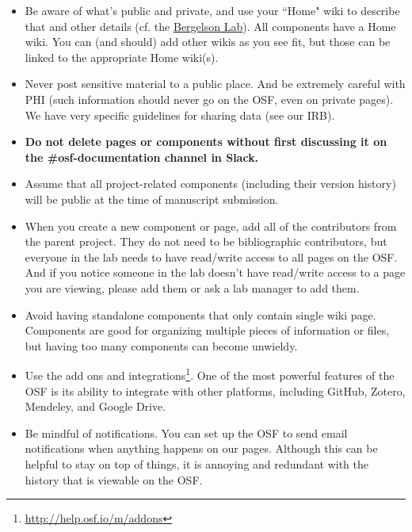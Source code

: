 \documentclass[letterpaper,12pt,oneside]{memoir}
\begin{document}
\begin{itemize}
\item Be aware of what's public and private, and use your ``Home" wiki to describe that and other details (cf. the \href{https://osf.io/3qg96/}{Bergelson Lab}). All components have a Home wiki. You can (and should) add other wikis as you see fit, but those can be linked to the appropriate Home wiki(s).

\item Never post sensitive material to a public place. And be extremely careful with PHI (such information should never go on the OSF, even on private pages). We have very specific guidelines for sharing data (see our IRB). 

\item \textbf{Do not delete pages or components without first discussing it on the \#osf-documentation channel in Slack.}

\item Assume that all project-related components (including their version history) will be public at the time of manuscript submission. 

\item When you create a new component or page, add all of the contributors from the parent project. They do not need to be bibliographic contributors, but everyone in the lab needs to have read/write access to all pages on the OSF. And if you notice someone in the lab doesn't have read/write access to a page you are viewing, please add them or ask a lab manager to add them. 

\item Avoid having standalone components that only contain single wiki page. Components are good for organizing multiple pieces of information or files, but having too many components can become unwieldy. 

\item Use the add ons and integrations\footnote{\url{http://help.osf.io/m/addons}}. One of the most powerful features of the OSF is its ability to integrate with other platforms, including GitHub, Zotero, Mendeley, and Google Drive. 

\item Be mindful of notifications. You can set up the OSF to send email notifications when anything happens on our pages. Although this can be helpful to stay on top of things, it is annoying and redundant with the history that is viewable on the OSF. 

\end{itemize}
\end{document}
